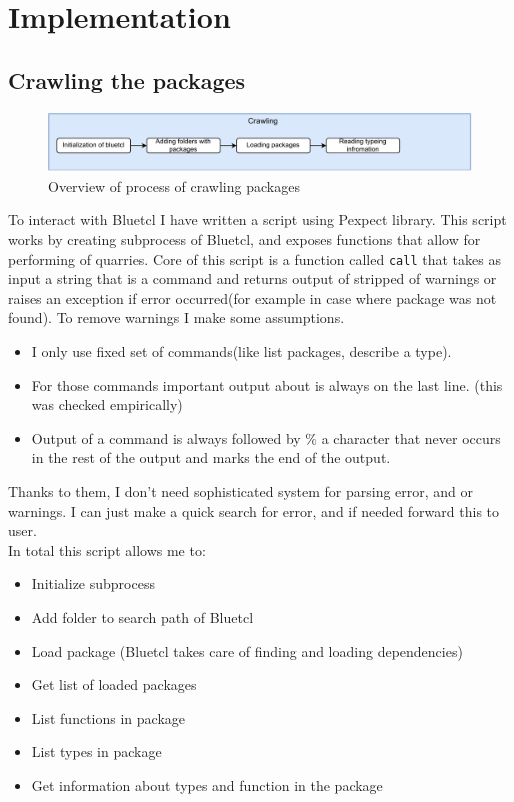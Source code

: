 \documentclass[14pt]{report}
\begin{document}
\chapter{Implementation}
\section{Crawling the packages}
\begin{figure}[!h]
    \centering
    \caption{Overview of process of crawling packages}

    \includegraphics[width=1.0\columnwidth]{pdfExports/LargeMap-Page-2.drawio.pdf}
\end{figure}
To interact with Bluetcl I have written a script using Pexpect library. This script works by creating subprocess of Bluetcl, and exposes functions that allow for performing of quarries. Core of this script is a function called \verb!call! that takes as input a string that is a command and returns output of stripped of warnings or raises an exception if error occurred(for example in case where package was not found). To remove warnings I make some assumptions.
\begin{itemize}
    \item I only use fixed set of commands(like list packages, describe a type).
    \item For those commands important output about is always on the last line. (this was checked empirically)
    \item Output of a command is always followed by $\%$ a character that never occurs in the rest of the output and marks the end of the output.
\end{itemize}
Thanks to them, I don't need sophisticated system for parsing error, and or warnings. I can just make a quick search for error, and if needed forward this to user.
\\ 
In total this script allows me to:
\begin{itemize}
    \item Initialize subprocess
    \item Add folder to search path of Bluetcl
    \item Load package (Bluetcl takes care of finding and loading dependencies)
    \item Get list of loaded packages
    \item List functions in package
    \item List types in package
    \item Get information about types and function in the package
\end{itemize}
\end{document}
